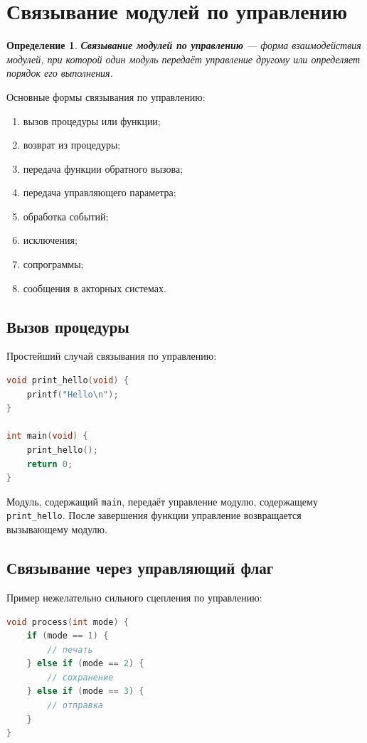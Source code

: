 \documentclass[12pt,a4paper]{article}
\newtheorem{definition}{Определение}
\begin{document}
\section{Связывание модулей по управлению}

\begin{definition}
\textbf{Связывание модулей по управлению} --- форма взаимодействия модулей, при которой один модуль передаёт управление другому или определяет порядок его выполнения.
\end{definition}

Основные формы связывания по управлению:
\begin{enumerate}
  \item вызов процедуры или функции;
  \item возврат из процедуры;
  \item передача функции обратного вызова;
  \item передача управляющего параметра;
  \item обработка событий;
  \item исключения;
  \item сопрограммы;
  \item сообщения в акторных системах.
\end{enumerate}

\subsection{Вызов процедуры}

Простейший случай связывания по управлению:

\begin{lstlisting}[language=C]
void print_hello(void) {
    printf("Hello\n");
}

int main(void) {
    print_hello();
    return 0;
}
\end{lstlisting}

Модуль, содержащий \texttt{main}, передаёт управление модулю, содержащему \texttt{print\_hello}. После завершения функции управление возвращается вызывающему модулю.

\subsection{Связывание через управляющий флаг}

Пример нежелательно сильного сцепления по управлению:

\begin{lstlisting}[language=C]
void process(int mode) {
    if (mode == 1) {
        // печать
    } else if (mode == 2) {
        // сохранение
    } else if (mode == 3) {
        // отправка
    }
}
\end{lstlisting}
\end{document}
